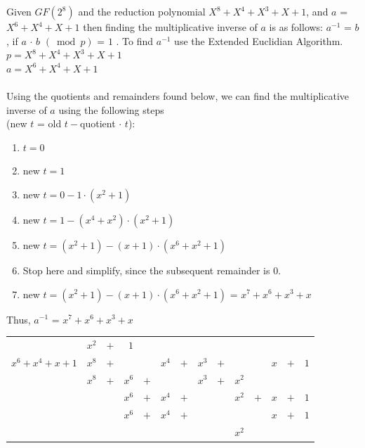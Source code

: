 \begin{eg} Given $GF(2^8)$ and the reduction polynomial $X^8 + X^4 + X^3 + X +1$, and $a$ = $X^6 + X^4 + X + 1$ then finding the multiplicative inverse of $a$ is as follows:  $a^{-1}$ = $b$, if $a$ $\cdot$ $b$ $(\bmod p)$ = $1$ .  To find $a^{-1}$ use the Extended Euclidian Algorithm.
\\
	$p =  X^8 + X^4 + X^3 + X +1$\\ 
	$a = X^6 + X^4 + X + 1$\\
\\Using the quotients and remainders found below, we can find the multiplicative inverse of $a$ using the following steps \\(new $t$ = old $t - $quotient $\cdot$ $t$):
\begin{enumerate}
\item $t = 0$
\item new $ t = 1$ 
\item new $t = 0 - 1\cdot(x^2 + 1)$
\item  new $t = 1 - (x^4 + x^2)\cdot(x^2 + 1)$
\item new $t = (x^2 + 1) - (x+1)\cdot(x^6 + x^2 + 1)$
\item Stop here and simplify, since the subsequent remainder is 0.
\item new $t = (x^2 + 1) - (x+1)\cdot(x^6 + x^2 + 1)$ = $x^7 + x^6 + x^3 + x$
\end{enumerate}
Thus, $a^{-1}$ = $x^7 + x^6 + x^3 + x$\\
\begin{center}
\begin{tabular}{rrcrcrcrcrcrcr}
        &  $x^2$  &  $+$  &      $1$         \\ \cline{2-14}
 \multicolumn{1}{r|}{$x^6 + x^4 + x + 1$}
        &  $x^8$  &  $+$  &    &      &  $x^4$  &  $+$  & $ x^3$  &  $+$  &   &   & $ x$  &  $+$  &  $1$  \\
        & $x^8$   &  $+$  &    $x^6$      &    $+$         &      &     &  $x^3$  &  $+$  & $x^2$        \\ \cline{2-14}
        &         &              &$x^6$ &$+$ &  $x^4$  & $+$   &              &          & $ x^2$  &   $+$  & $x$   &  $+$  & $1$       \\
        &         &              &$x^6$ &$+$ &  $x^4$  & $+$   &              &          &   &    & $x$   &  $+$  & $1$   \\ \cline{4-14}
        &         &               &          &      &             &           &       &     & $x^2$ 
\end{tabular}
\end{center}


\end{eg}
